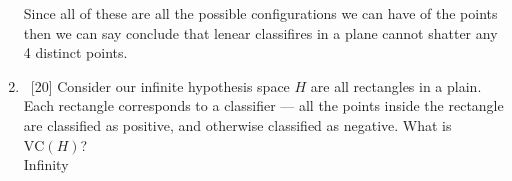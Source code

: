 \documentclass[12pt, fullpage,letterpaper]{article}
\DeclareMathOperator{\Hcal}{\mathcal{H}}
\begin{document}
\begin{enumerate}
    Since all of these are all the possible configurations we can have of the points then we can say conclude that
    lenear classifires in a plane cannot shatter any 4 distinct points.



\item~[20] Consider our infinite hypothesis space $H$ are all rectangles in a plain. Each rectangle corresponds to a classifier --- all the points inside the rectangle are classified as positive, and otherwise classified as negative. What is $\mathrm{VC}(H)$?\\
Infinity
\end{enumerate}
\end{document}
